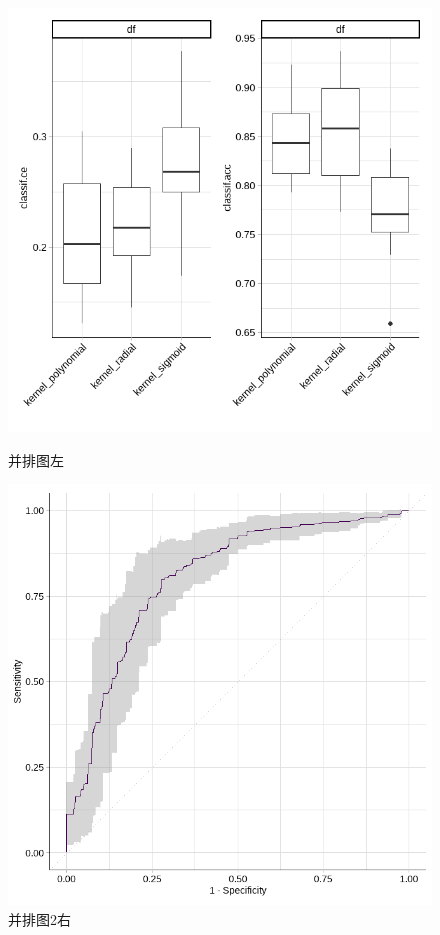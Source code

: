 \documentclass{ctexart}
\theoremstyle{plain} 		     %
\theoremstyle{definition} 		 %
\theoremstyle{remark} 			 %
\begin{document}
\begin{figure}[htbp]
	\centering
	\begin{minipage}{12em}
		\centering
		\includegraphics[width=1\textwidth]{fig2}
		\caption{并排图左}\label{fig2}
	\end{minipage}
	\qquad
	\begin{minipage}{12em}
		\centering
		\includegraphics[width=1\textwidth]{fig3}
		\caption{并排图2右}\label{fig3}
	\end{minipage}
\end{figure}
\end{document}
